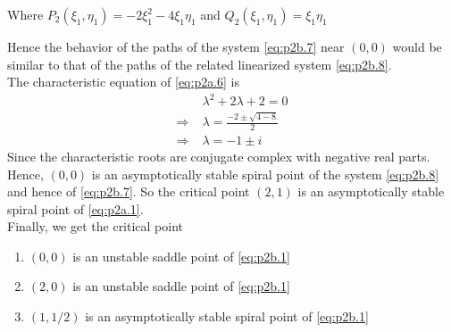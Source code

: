 \documentclass[../main-sheet.tex]{subfiles}
\begin{document}
\begin{soln}[b]
\begin{enumerate}[label=(\roman*)]
        Where \(P_2(\xi_1,\eta_1)=-2\xi_1^2-4\xi_1\eta_1\) and \(Q_2(\xi_1,\eta_1)=\xi_1\eta_1\)
    \end{enumerate}
    Hence the behavior of the paths of the system \eqref{eq:p2b.7} near \((0,0)\) would be similar to that of the paths of the related linearized system \eqref{eq:p2b.8}.\\
    The characteristic equation of \eqref{eq:p2a.6} is
    \begin{align*}
        &\lambda^2+2\lambda+2=0\\
        \Rightarrow\;&\lambda=\frac{-2\pm \sqrt{4-8}}{2}\\
        \Rightarrow\;&\lambda=-1\pm i
    \end{align*}
    Since the characteristic roots are conjugate complex with negative real parts. Hence, \((0,0)\) is an asymptotically stable spiral point of the system \eqref{eq:p2b.8} and hence of \eqref{eq:p2b.7}. So the critical
    point \((2,1)\) is an asymptotically stable spiral point of \eqref{eq:p2a.1}.\\



    Finally, we get the critical point 
    \begin{enumerate}[label=(\roman*)]
        \item \((0,0)\) is an unstable saddle point of \eqref{eq:p2b.1}
        \item \((2,0)\) is an unstable saddle point of \eqref{eq:p2b.1}
        \item \((1,1/2)\) is an asymptotically stable spiral point of \eqref{eq:p2b.1}
    \end{enumerate}


\end{soln}
\end{document}
